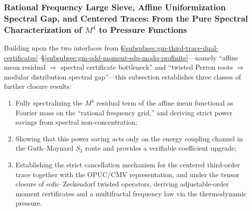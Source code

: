 \subsubsection{Rational Frequency Large Sieve, Affine Uniformization Spectral Gap, and Centered Traces: From the Pure Spectral Characterization of \texorpdfstring{$M^4$}{M4} to Pressure Functions}\label{subsubsec:gm-rational-sieve-affine-centered-opuc-multifractal}
Building upon the two interfaces from \S\ref{subsubsec:gm-third-trace-dual-certificates}--\S\ref{subsubsec:gm-odd-moment-sdp-modq-profinite}---namely ``affine mean residual \(\Rightarrow\) spectral certificate bottleneck'' and ``twisted Perron roots \(\Rightarrow\) modular distribution spectral gap''---this subsection establishes three classes of further closure results:
\begin{enumerate}
  \item Fully spectralizing the \(M^4\) residual term of the affine mean functional as Fourier mass on the ``rational frequency grid,'' and deriving strict power savings from spectral non-concentration;
  \item Showing that this power saving acts only on the energy coupling channel in the Guth--Maynard \(S_3\) route and provides a verifiable coefficient upgrade;
  \item Establishing the strict cancellation mechanism for the centered third-order trace together with the OPUC/CMV representation, and under the tensor closure of sofic--Zeckendorf twisted operators, deriving adjustable-order moment certificates and a multifractal frequency law via the thermodynamic pressure.
\end{enumerate}

